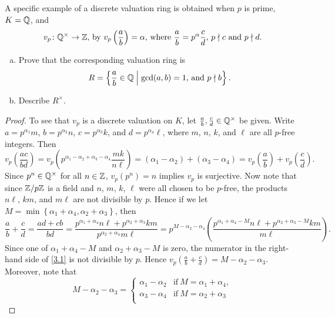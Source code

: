 \documentclass[10pt]{amsart}
\begin{document}
\begin{thm}
  A specific example of a discrete valuation ring is obtained when $p$ is prime, $K = \Q$, and 
  $$v_p \colon \Q^\times \rightarrow \Z,\, \text{by}\  v_p\left(\frac{a}{b}\right) = \alpha,\, \text{where}\  \frac{a}{b} = p^\alpha\frac{c}{d},\, p \nmid c\ \text{and}\ p \nmid d.$$
  \begin{enumerate}[(a)]
  \item
    Prove that the corresponding valuation ring is 
    $$R = \left\{\frac{a}{b} \in \Q \;\middle\vert\; \gcd(a,b) = 1,\, \text{and}\ p\nmid b\right\}.$$
  \item
    Describe $R^\times$.
  \end{enumerate}
  \begin{proof}
    To see that $v_p$ is a discrete valuation on $K$, let $\frac{a}{b}, \frac{c}{d} \in \Q^\times$ be given.
    Write $a = p^{\alpha_1}m$, $b = p^{\alpha_2}n$, $c = p^{\alpha_3}k$, and $d = p^{\alpha_4}\ell$, where $m$, $n$, $k$, and $\ell$ are all $p$-free integers.
    Then 
    $$v_p\left(\frac{ac}{bd}\right) = v_p\left(p^{\alpha_1 - \alpha_2 + \alpha_3 - \alpha_4}\frac{mk}{n\ell}\right) = (\alpha_1 - \alpha_2) + (\alpha _3  - \alpha_4) = v_p\left(\frac{a}{b}\right) + v_p\left(\frac{c}{d}\right).$$
    Since $p^n \in \Q^\times$ for all $n \in \Z$, $v_p(p^n) = n$ implies $v_p$ is surjective.
    Now note that since $\Z/p\Z$ is a field and $n$, $m$, $k$, $\ell$ were all chosen to be $p$-free, the products $n\ell$, $km$, and $m\ell$ are not divisible by $p$.
    Hence if we let $M = \min\left\{\alpha_1 + \alpha_4, \alpha_2 + \alpha_3\right\}$, then
    \begin{equation}\label{3.1}
      \frac{a}{b} + \frac{c}{d} = \frac{ad + cb}{bd} = \frac{p^{\alpha_1 + \alpha_4}n\ell + p^{\alpha_2 + \alpha_3}km}{p^{\alpha_2 + \alpha_4}m\ell} = p^{M - \alpha_2 - \alpha_4}\left(\frac{p^{\alpha_1 + \alpha_4 - M}n\ell + p^{\alpha_2 + \alpha_3 - M}km}{m\ell}\right).
    \end{equation}
    Since one of $\alpha_1 + \alpha_4 - M$ and $\alpha_2 + \alpha_3 - M$ is zero, the numerator in the right-hand side of \eqref{3.1} is not divisible by $p$.
    Hence $v_p\left(\frac{a}{b} + \frac{c}{d}\right) = M - \alpha_2 - \alpha_3$.
    Moreover, note that 
    $$M - \alpha_2 - \alpha_3 = \left\{
    \begin{array}{ll}
      \alpha_1 - \alpha_2 & \text{if}\ M = \alpha_1 + \alpha_4,\\
      \alpha_3 - \alpha_4 & \text{if}\ M = \alpha_2 + \alpha_3\\

\end{array}$$
\end{proof}
\end{thm}
\end{document}
